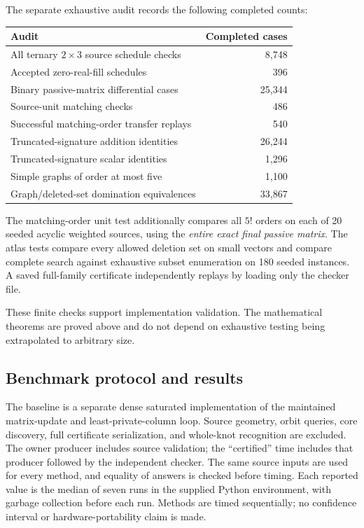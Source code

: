 \documentclass[11pt,letterpaper]{article}
\theoremstyle{definition}
\begin{document}
The separate exhaustive audit records the following completed counts:
\begin{center}
\begin{tabular}{lr}
\toprule
Audit & Completed cases\\
\midrule
All ternary $2\times3$ source schedule checks & 8,748\\
Accepted zero-real-fill schedules & 396\\
Binary passive-matrix differential cases & 25,344\\
Source-unit matching checks & 486\\
Successful matching-order transfer replays & 540\\
Truncated-signature addition identities & 26,244\\
Truncated-signature scalar identities & 1,296\\
Simple graphs of order at most five & 1,100\\
Graph/deleted-set domination equivalences & 33,867\\
\bottomrule
\end{tabular}
\end{center}
The matching-order unit test additionally compares all $5!$ orders on each of 20 seeded acyclic weighted sources, using the \emph{entire exact final passive matrix}. The atlas tests compare every allowed deletion set on small vectors and compare complete search against exhaustive subset enumeration on 180 seeded instances. A saved full-family certificate independently replays by loading only the checker file.

These finite checks support implementation validation. The mathematical theorems are proved above and do not depend on exhaustive testing being extrapolated to arbitrary size.

\subsection{Benchmark protocol and results}
The baseline is a separate dense saturated implementation of the maintained matrix-update and least-private-column loop. Source geometry, orbit queries, core discovery, full certificate serialization, and whole-knot recognition are excluded. The owner producer includes source validation; the ``certified'' time includes that producer followed by the independent checker. The same source inputs are used for every method, and equality of answers is checked before timing. Each reported value is the median of seven runs in the supplied Python environment, with garbage collection before each run. Methods are timed sequentially; no confidence interval or hardware-portability claim is made.
\end{document}
